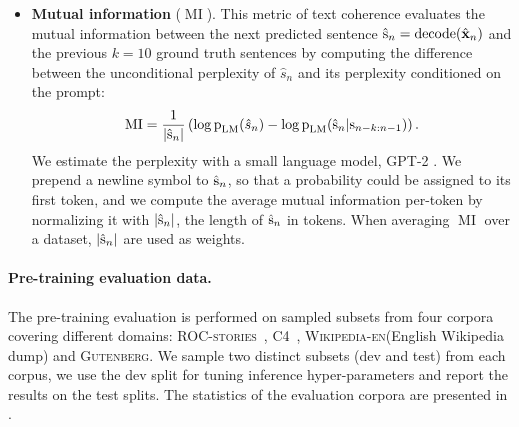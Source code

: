 \documentclass[twoside,11pt]{fairmeta}
\DeclareMathOperator{\decode}{decode}
\DeclareMathOperator{\mutinfo}{MI}
\newcommand{\cfour}{\textsc{C4}\xspace}
\newcommand{\rocstories}{\textsc{ROC-stories}\xspace}
\newcommand{\wikipedia}{\textsc{Wikipedia-en}\xspace}
\newcommand{\gutenberg}{\textsc{Gutenberg}\xspace}
\def\rp{{\textnormal{p}}}
\def\rs{{\textnormal{s}}}
\def\rvx{{\mathbf{x}}}
\begin{document}
\begin{itemize}[style=unboxed,leftmargin=*]
\item \textbf{Mutual information} ($\mutinfo$). This metric of text coherence evaluates the mutual information between the next predicted sentence $\hat \rs_n = \decode(\hat \rvx_n)$ and the previous $k=10$  ground truth sentences by computing the difference between the unconditional perplexity of $\hat s_n$ and its perplexity conditioned on the prompt:
\[ \mutinfo = \frac{1}{|\hat \rs_n|}\left( \log \rp_\text{LM}(\hat s_n) - \log \rp_\text{LM}(\hat \rs_n|\rs_{n-k:n-1}) \right).\]
We estimate the perplexity with a small language model, GPT-2 \citep{radford2019language}. We prepend a newline symbol to $\hat \rs_n$, so that a probability could be assigned to its first token, and we compute the average mutual information per-token by normalizing it with $|\hat \rs_n|$, the length of $\hat \rs_n$ in tokens. When averaging $\mutinfo$ over a dataset, $|\hat \rs_n|$ are used as weights.
\end{itemize}

\paragraph{Pre-training evaluation data.}
The pre-training evaluation is performed on sampled subsets from four corpora covering different domains: \rocstories~\citep{rocstories}, \cfour~\citep{c4}, \wikipedia (English Wikipedia dump) and \gutenberg.  
We sample two distinct subsets (dev and test) from each corpus, we use the dev split for tuning inference hyper-parameters and report the results on the test splits.
The statistics of the evaluation corpora are presented in . 
\end{document}

